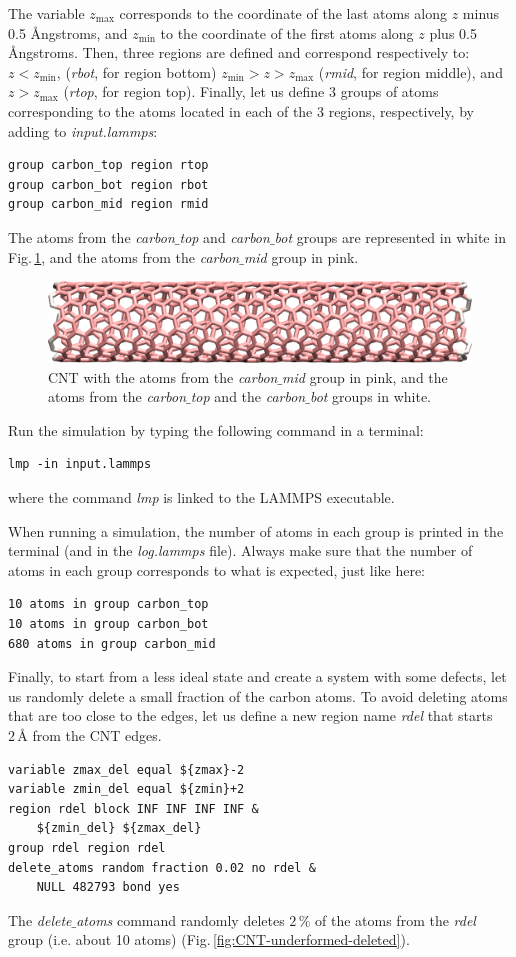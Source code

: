 \documentclass[9pt,tutorial]{livecoms}
\begin{document}
\noindent The variable $z_\mathrm{max}$ corresponds to the coordinate of the last atoms along $z$ minus 0.5 Ångstroms, and $z_\mathrm{min}$ to the coordinate of the first atoms along $z$ plus 0.5 Ångstroms. Then, three regions are defined and correspond respectively to: $z < z_\mathrm{min}$, (\textit{rbot}, for region bottom) $z_\mathrm{min} > z > z_\mathrm{max}$ (\textit{rmid}, for region middle), and $z > z_\mathrm{max}$ (\textit{rtop}, for region top). Finally, let us define 3 groups of atoms corresponding to the atoms located in each of the 3 regions, respectively, by adding to \textit{input.lammps}:
{\normalsize \begin{verbatim}
group carbon_top region rtop
group carbon_bot region rbot
group carbon_mid region rmid
\end{verbatim}}
The atoms from the \textit{carbon$\_$top} and \textit{carbon$\_$bot} groups are represented in white in Fig.\,\ref{fig:CNT-underformed}, and the atoms from the \textit{carbon$\_$mid} group in pink.

\begin{figure}
\centering
\includegraphics[width=\linewidth]{CNT-underformed}
\caption{CNT with the atoms from the \textit{carbon$\_$mid} group in pink, and the atoms from the \textit{carbon$\_$top} and the \textit{carbon$\_$bot} groups in white.}
\label{fig:CNT-underformed}
\end{figure}

Run the simulation by typing the following command in a terminal:
{\normalsize \begin{verbatim}
lmp -in input.lammps
\end{verbatim}}
where the command \textit{lmp} is linked to the LAMMPS executable.

When running a simulation, the number of atoms in each group is printed in the terminal (and in the \textit{log.lammps} file). Always make sure that the number of atoms in each group corresponds to what is expected, just like here:
{\normalsize \begin{verbatim}
10 atoms in group carbon_top
10 atoms in group carbon_bot
680 atoms in group carbon_mid
\end{verbatim}}
Finally, to start from a less ideal state and create a system with some defects,
let us randomly delete a small fraction of the carbon atoms. To avoid deleting atoms that are too close to the edges, let us define a new region name \textit{rdel} that starts $2\,\text{\AA{}}$ from the CNT edges.
{\normalsize \begin{verbatim}
variable zmax_del equal ${zmax}-2
variable zmin_del equal ${zmin}+2
region rdel block INF INF INF INF &
    ${zmin_del} ${zmax_del}
group rdel region rdel
delete_atoms random fraction 0.02 no rdel &
    NULL 482793 bond yes
\end{verbatim}}
The \textit{delete$\_$atoms} command randomly deletes $2\,\%$ of the atoms from the \textit{rdel} group (i.e. about 10 atoms) (Fig.\,\ref{fig:CNT-underformed-deleted}).
\end{document}
